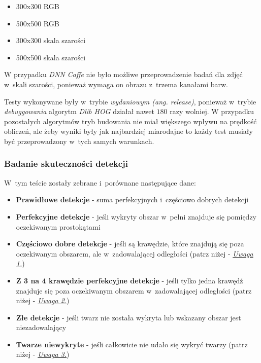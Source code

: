 \begin{itemize}
    \item 300x300 RGB
    \item 500x500 RGB
    \item 300x300 skala szarości
    \item 500x500 skala szarości
\end{itemize}

W przypadku \textit{DNN Caffe} nie było możliwe przeprowadzenie badań dla zdjęć w~skali szarości, ponieważ wymaga on obrazu z~trzema kanałami barw.

\par

Testy wykonywane były w~trybie \textit{wydaniowym (ang. release)}, ponieważ w~trybie \textit{debuggowania} algorytm \textit{Dlib HOG} działał nawet $180$ razy wolniej. W przypadku pozostałych algorytmów tryb budowania nie miał większego wpływu na prędkość obliczeń, ale żeby wyniki były jak najbardziej miarodajne to każdy test musiały być przeprowadzony w~tych samych warunkach.







\subsubsection{Badanie skuteczności detekcji} \label{section:skutecznosc_detekcji_twarzy}

W~tym teście zostały zebrane i~porównane następujące dane:
\begin{itemize}
    \item \textbf{Prawidłowe detekcje} - suma perfekcyjnych i~częściowo dobrych detekcji
    \item \textbf{Perfekcyjne detekcje} - jeśli wykryty obszar w~pełni znajduje się pomiędzy oczekiwanym prostokątami
    \item \textbf{Częściowo dobre detekcje} - jeśli są krawędzie, które znajdują się poza oczekiwanym obszarem, ale w~zadowalającej odległości (patrz niżej - \hyperref[{uwaga:czesciowo_dobry}]{\textit{Uwaga 1.}})
    \item \textbf{Z 3 na 4 krawędzie perfekcyjne detekcje} - jeśli tylko jedna krawędź znajduje się poza oczekiwanym obszarem w~zadowalającej odległości (patrz niżej - \hyperref[{uwaga:3_4_perfekcyjny}]{\textit{Uwaga 2.}})
    \item \textbf{Złe detekcje} - jeśli twarz nie została wykryta lub wskazany obszar jest niezadowalający
    \item \textbf{Twarze niewykryte} - jeśli całkowicie nie udało się wykryć twarzy (patrz niżej - \hyperref[{uwaga:dodatkowy_zle}]{\textit{Uwaga 3.}})
\end{itemize}

